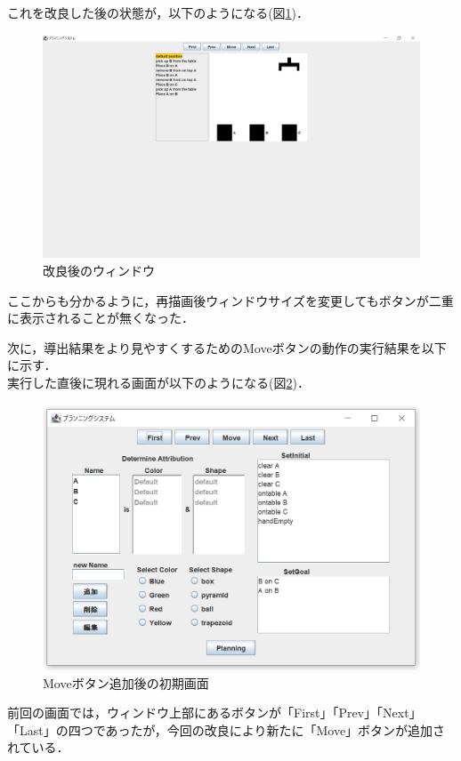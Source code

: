 \documentclass[12pt]{jarticle}
\begin{document}
\clearpage

これを改良した後の状態が，以下のようになる(図\ref{fig:ButOK})．\\

\begin{figure}[htbp]
  \begin{center}
    \includegraphics[scale=0.4]{images/ButOK.PNG}
    \caption{改良後のウィンドウ}
    \label{fig:ButOK}
  \end{center}
\end{figure}
ここからも分かるように，再描画後ウィンドウサイズを変更してもボタンが二重に表示されることが無くなった．\\
\clearpage

次に，導出結果をより見やすくするためのMoveボタンの動作の実行結果を以下に示す．\\

実行した直後に現れる画面が以下のようになる(図\ref{fig:FirstPage})．\\

\begin{figure}[htbp]
  \begin{center}
    \includegraphics[scale=0.8]{images/FirstPage.PNG}
    \caption{Moveボタン追加後の初期画面}
    \label{fig:FirstPage}
  \end{center}
\end{figure}
前回の画面では，ウィンドウ上部にあるボタンが「First」「Prev」「Next」「Last」の四つであったが，今回の改良により新たに「Move」ボタンが追加されている．\\
\end{document}

